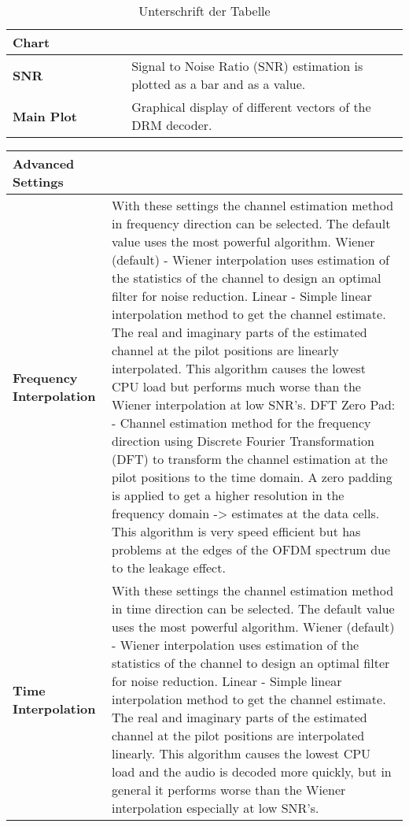 \begin{table}[ht]
	\begin{center}
		\begin{tabular}{p{0.3\linewidth} | p{0.7\linewidth}}
			\textbf{Chart} & \\
			\hline
			\textbf{SNR} & Signal to Noise Ratio (SNR) estimation is plotted as a bar and as a value.
			\\
			\textbf{Main Plot} & Graphical display of different vectors of the DRM decoder. \\
			\hline
		\end{tabular}
		\caption{Unterschrift  der Tabelle}
		\label{tab:Tabelle1}
	\end{center}
\end{table}

\begin{table}[htb]
	\begin{center}
		\begin{tabular}{p{0.25\linewidth} | p{0.75\linewidth}}	
			
			\textbf{Advanced Settings} &  \\
			\hline
			\textbf{Frequency Interpolation} & With these settings the channel estimation method in frequency direction can be selected. The default value uses the most powerful algorithm.
			Wiener (default) - Wiener interpolation uses estimation of the statistics of the channel to design an optimal filter for noise reduction.
			Linear - Simple linear interpolation method to get the channel estimate. The real and imaginary parts of the estimated channel at the pilot positions are linearly interpolated. This algorithm causes the lowest CPU load but performs much worse than the Wiener interpolation at low SNR's.
			DFT Zero Pad: - Channel estimation method for the frequency direction using Discrete Fourier Transformation (DFT) to transform the channel estimation at the pilot positions to the time domain. A zero padding is applied to get a higher resolution in the frequency domain -> estimates at the data cells. This algorithm is very speed efficient but has problems at the edges of the OFDM spectrum due to the leakage effect. \\
			\textbf{Time Interpolation} & With these settings the channel estimation method in time direction can be selected. The default value uses the most powerful algorithm.
			Wiener (default) - Wiener interpolation uses estimation of the statistics of the channel to design an optimal filter for noise reduction.
			Linear - Simple linear interpolation method to get the channel estimate. The real and imaginary parts of the estimated channel at the pilot positions are interpolated linearly. This algorithm causes the lowest CPU load and the audio is decoded more quickly, but in general it performs worse than the Wiener interpolation especially at low SNR's. \\
			

\end{tabular}
\end{center}
\end{table}
